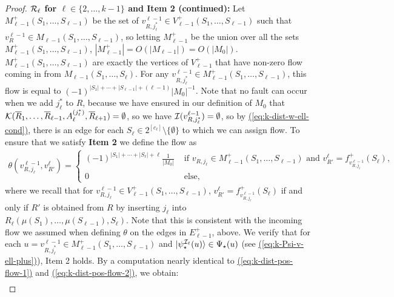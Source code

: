 \documentclass{theoretics}
\newcommand{\eq}[1]{\hyperref[eq:#1]{(\ref*{eq:#1})}}
\def\ket#1{{\lvert}#1\rangle}
\renewcommand{\>}{\rangle}
\newcommand{\<}{\langle}
\renewcommand{\(}{\left(}
\renewcommand{\)}{\right)}
\def\abs#1{\left| #1 \right|}
\begin{document}
\begin{proof}
\vskip7pt	
\noindent\textbf{${\cal R}_{\ell}$ for $\ell \in \{2,\dots,k-1\}$ and Item 2 (continued):} Let $M_{\ell-1}^{+}(S_1,\dots,S_{\ell-1})$ be the set of $v^{\ell-1}_{R,j^*_{\ell}}\in V_{\ell-1}^+(S_1,\dots,S_{\ell-1})$ such that $v^{\ell-1}_{R}\in M_{\ell-1}(S_1,\dots,S_{\ell-1})$, so letting $M_{\ell-1}^+$ be the union over all the sets $M_{\ell-1}^+(S_1,\dots,S_{\ell-1})$, $\abs{M_{\ell-1}^{+}} = O\left(\abs{M_{\ell-1}}\right) =  O\left(\abs{M_0}\right)$. $M_{\ell-1}^+(S_1,\dots,S_{\ell-1})$ are exactly the vertices of $V_{\ell-1}^+$ that have non-zero flow coming in from $M_{\ell-1}(S_1,\dots,S_{\ell})$. For any $v^{\ell-1}_{R,j^*_{\ell}}\in M_{\ell-1}^+(S_1,\dots,S_{\ell-1})$, this flow is equal to $(-1)^{\abs{S_1} + \cdots +\abs{S_{\ell-1}}+(\ell-1)}{\abs{M_0}}^{-1}$. Note that no fault can occur when we add $j_{\ell}^*$ to $R$, because we have ensured in our definition of $M_0$ that ${\cal K}(\overline{R}_1,\dots,\overline{R}_{\ell-1},A_{\ell}^{(j_{\ell}^*)},\overline{R}_{\ell+1})=\emptyset$, so we have ${\cal I}(v_{R,j_{\ell}^*}^{\ell-1})=\emptyset$, so by \eq{k-dist-w-ell-cond}, there is an edge for each $S_{\ell}\in 2^{[c_{\ell}]}\setminus\{\emptyset\}$ to which we can assign flow. 
To ensure that we satisfy \textbf{Item 2} we define the flow as
		\begin{align}\label{eq:k-dist-theta-later}
			 \theta(v^{\ell-1}_{R,j_{\ell}},v_{R'}^{\ell}) 
= \begin{cases}
			\left(-1\right)^{\abs{S_1} + \cdots +\abs{S_{\ell}}+\ell}\frac{1}{\abs{M_0}} &\text{ if } v_{R,j_{\ell}} \in M_{\ell-1}^+(S_1,\dots,S_{\ell-1}) \text{ and } v_{R'}^{\ell}=f^+_{v^{\ell-1}_{R,j_{\ell}}}(S_{\ell}),\\
			0 &\text{ else},
			\end{cases}
		\end{align}
where we recall that for $v_{R,j_{\ell}}^{\ell-1}\in V_{\ell-1}^+(S_1,\dots,S_{\ell-1})$, $v_{R'}^{\ell}=f^+_{v_{R,j_{\ell}}^{\ell-1}}(S_{\ell})$ if and only if $R'$ is obtained from $R$ by inserting $j_{\ell}$ into $R_{\ell}(\mu(S_1),\dots,\mu(S_{\ell-1}),S_{\ell})$. Note that this is consistent with the incoming flow we assumed when defining $\theta$ on the edges in $E_{\ell-1}^+$, above. 
We verify that for each $u=v_{R,j_{\ell}^*}^{\ell-1}\in M_{\ell-1}^+(S_1,\dots,S_{\ell-1})$ and $\ket{\psi^{{\cal I}_{\ell}}_\star(u)}\in \Psi_\star(u)$ (see \eq{k-Psi-v-ell-plus}), Item 2 holds. By a computation nearly identical to \eq{k-dist-pos-flow-1} and \eq{k-dist-pos-flow-2}, we obtain:
\begin{align*}

\end{align*}
\end{proof}
\end{document}
